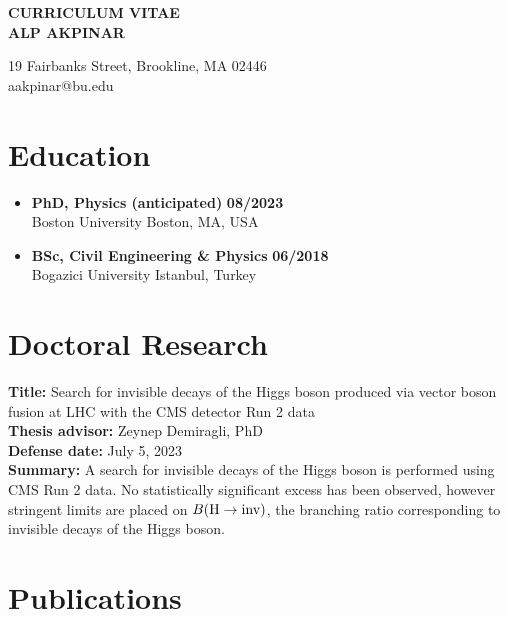 

\begin{center}
{\LARGE {\bf CURRICULUM VITAE}}\\
\vspace{0.5in}
{\large {\bf ALP AKPINAR}}
\end{center}

\begin{center}
    19 Fairbanks Street, Brookline, MA 02446 \\
    aakpinar@bu.edu
\end{center}

\section*{Education}
\begin{itemize}
    \item \textbf{PhD, Physics (anticipated)} \hfill \textbf{08/2023} \\
    Boston University \hfill Boston, MA, USA 
    \item \textbf{BSc, Civil Engineering \& Physics} \hfill \textbf{06/2018} \\
    Bogazici University \hfill Istanbul, Turkey
\end{itemize}


\section*{Doctoral Research}

\textbf{Title:} Search for invisible decays of the Higgs boson produced via
vector boson fusion at LHC with the CMS detector Run 2 data \\
\textbf{Thesis advisor:} Zeynep Demiragli, PhD \\
\textbf{Defense date:} July 5, 2023 \\
\textbf{Summary:} A search for invisible decays of the Higgs boson is performed using
CMS Run 2 data. No statistically significant excess has been observed, however stringent
limits are placed on ${B(\textrm{H}\rightarrow\text{inv})}$, the branching ratio corresponding to invisible decays of the
Higgs boson.

\section*{Publications}

